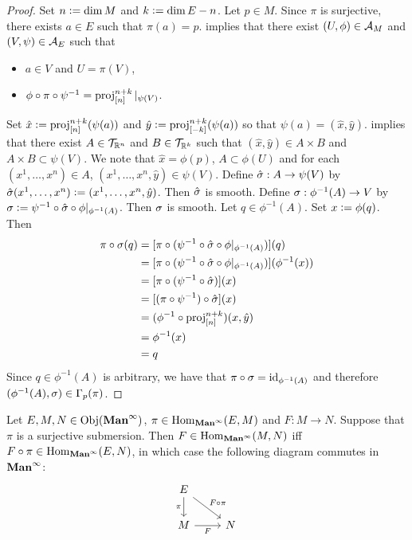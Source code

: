\documentclass{book}
\begin{document}
	\begin{proof}
		Set $n \vcentcolon= \dim M$ and $k \vcentcolon= \dim E - n$. Let $p \in M$. Since $\pi$ is surjective, there exists $a \in E$ such that $\pi(a) = p$.  implies that there exist $(U, \phi) \in \mathcal{A}_M$ and $(V, \psi) \in \mathcal{A}_E$ such that 
		\begin{itemize}
			\item $a \in V$ and $U = \pi(V)$,
			\item $\phi \circ \pi \circ \psi^{-1} = \operatorname{\text{proj}}^{n+k}_{[n]}|_{\psi(V)}$. 
		\end{itemize} 
		Set $\hat{x} \vcentcolon= \operatorname{\text{proj}}^{n+k}_{[n]}(\psi(a))$ and $\hat{y} \vcentcolon= \operatorname{\text{proj}}^{n+k}_{[-k]}(\psi(a))$ so that $\psi(a) = (\hat{x}, \hat{y})$.  implies that there exist $A \in \mathcal{T}_{\mathbb{R}^n}$ and $B \in \mathcal{T}_{\mathbb{R}^k}$ such that $(\hat{x}, \hat{y}) \in A \times B$ and $A \times B \subset \psi(V)$. We note that $\hat{x} = \phi(p)$, $A \subset \phi(U)$ and for each $(x^1, \ldots, x^n) \in A$, $(x^1, \ldots, x^n, \hat{y}) \in \psi(V)$. Define $\hat{\sigma}:A \rightarrow \psi(V)$ by $\hat{\sigma}(x^1, \ldots, x^n) \vcentcolon= (x^1, \ldots, x^n, \hat{y})$. Then $\hat{\sigma}$ is smooth. Define $\sigma:\phi^{-1}(A) \rightarrow V$ by $\sigma \vcentcolon= \psi^{-1} \circ \hat{\sigma} \circ \phi|_{\phi^{-1}(A)}$. Then $\sigma$ is smooth. Let $q \in \phi^{-1}(A)$. Set $x \vcentcolon= \phi(q)$. Then 
		\begin{align*}
			\pi \circ \sigma (q)
			& = [\pi \circ (\psi^{-1} \circ \hat{\sigma} \circ \phi|_{\phi^{-1}(A)})] (q) \\
			& = [\pi \circ (\psi^{-1} \circ \hat{\sigma} \circ \phi|_{\phi^{-1}(A)})] (\phi^{-1}(x)) \\
			& = [\pi \circ (\psi^{-1} \circ \hat{\sigma})] (x) \\
			& = [(\pi \circ \psi^{-1}) \circ \hat{\sigma}] (x) \\
			& = (\phi^{-1} \circ \operatorname{\text{proj}}^{n+k}_{[n]}) (x, \hat{y}) \\
			& = \phi^{-1}(x) \\
			& = q
		\end{align*}
		Since $q \in \phi^{-1}(A)$ is arbitrary, we have that $\pi \circ \sigma = \operatorname{id}_{\phi^{-1}(A)}$ and therefore $(\phi^{-1}(A), \sigma) \in \Gamma_{p}(\pi)$.
	\end{proof}

	\begin{ex} 
		Let $E, M, N \in \operatorname{Obj}(\operatorname*{\text{\textbf{Man}}^{\infty}})$, $\pi \in \operatorname{Hom}_{\operatorname*{\text{\textbf{Man}}^{\infty}}}(E, M)$ and $F: M \rightarrow N$. Suppose that $\pi$ is a surjective submersion. Then $F \in \operatorname{Hom}_{\operatorname*{\text{\textbf{Man}}^{\infty}}}(M, N)$ iff $F \circ \pi \in \operatorname{Hom}_{\operatorname*{\text{\textbf{Man}}^{\infty}}}(E, N)$, in which case the following diagram commutes in $\operatorname*{\text{\textbf{Man}}^{\infty}}$:
		\[ 
		\begin{tikzcd}
			E \arrow[d, "\pi"'] \arrow[dr, "F \circ \pi"] &   \\
			M \arrow[r, "F"'] &  N
		\end{tikzcd}
		\]
	\end{ex}
\end{document}
